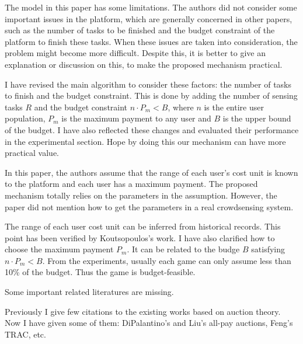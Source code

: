 \documentclass[a4paper,11pt]{exam}
\begin{document}
\begin{questions}
\question The model in this paper has some limitations. The authors did not consider some important issues in the platform, which are generally concerned in other papers, such as the number of tasks to be finished and the budget constraint of the platform to finish these tasks. When these issues are taken into consideration, the problem might become more difficult. Despite this, it is better to give an explanation or discussion on this, to make the proposed mechanism practical. 
\begin{solution}
I have revised the main algorithm to consider these factors: the number of tasks to finish and the budget constraint. This is done by adding the number of sensing tasks $R$ and the budget constraint $n\cdot P_m < B$, where $n$ is the entire user population, $P_m$ is the maximum payment to any user and $B$ is the upper bound of the budget. I have also reflected these changes and evaluated their performance in the experimental section. Hope by doing this our mechanism can have more practical value.
\end{solution}

\question In this paper, the authors assume that the range of each user’s cost unit is known to the platform and each user has a maximum payment. The proposed mechanism totally relies on the parameters in the assumption. However, the paper did not mention how to get the parameters in a real crowdsensing system.
\begin{solution}
The range of each user cost unit can be inferred from historical records. This point has been verified by Koutsopoulos's work. I have also clarified how to choose the maximum payment $P_m$. It can be related to the budge $B$ satisfying $n\cdot P_m < B$. From the experiments, usually each game can only assume less than 10\% of the budget. Thus the game is budget-feasible. 
\end{solution}

\question Some important related literatures are missing.
\begin{solution}
Previously I give few citations to the existing works based on auction theory. Now I have given some of them: DiPalantino's and Liu's all-pay auctions, Feng's TRAC, etc.
\end{solution}


\end{questions}
\end{document}
